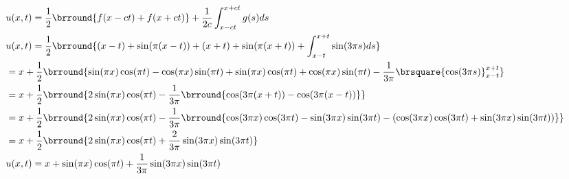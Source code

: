 \begin{small}
\begin{align*}
    &u(x,t)=\frac{1}{2}\brround{f(x-ct)+f(x+ct)}+\frac{1}{2c}\int_{x-ct}^{x+ct}g(s)ds\\
    &u(x,t)=\frac{1}{2}\brround{(x-t)+\sin(\pi(x-t))+(x+t)+\sin(\pi(x+t))+\int_{x-t}^{x+t}\sin(3\pi s)ds}\\
    &=x+\frac{1}{2}\brround{\sin(\pi x)\cos(\pi t)-\cos(\pi x)\sin(\pi t)+\sin(\pi x)\cos(\pi t)+\cos(\pi x)\sin(\pi t)-\frac{1}{3\pi}\brsquare{\cos(3\pi s)}_{x-t}^{x+t}}\\
    &=x+\frac{1}{2}\brround{2\sin(\pi x)\cos(\pi t)-\frac{1}{3\pi}\brround{\cos(3\pi(x+t))-\cos(3\pi(x-t))}}\\
    &=x+\frac{1}{2}\brround{2\sin(\pi x)\cos(\pi t)-\frac{1}{3\pi}\brround{\cos(3\pi x)\cos(3\pi t)-\sin(3\pi x)\sin(3\pi t)-(\cos(3\pi x)\cos(3\pi t)+\sin(3\pi x)\sin(3\pi t))}}\\
    &=x+\frac{1}{2}\brround{2\sin(\pi x)\cos(\pi t)+\frac{2}{3\pi}\sin(3\pi x)\sin(3\pi t)}\\
    &u(x,t)=x+\sin(\pi x)\cos(\pi t)+\frac{1}{3\pi}\sin(3\pi x)\sin(3\pi t)
\end{align*}
\end{small}